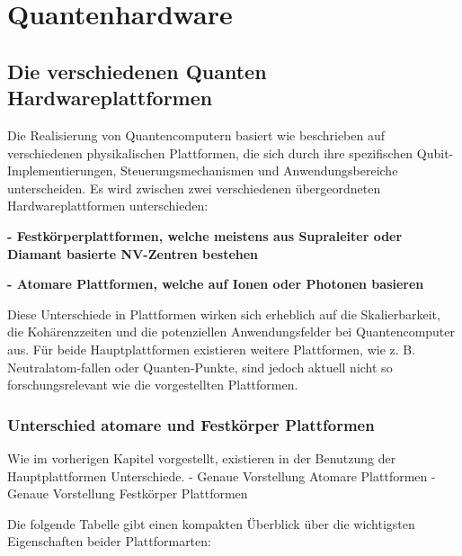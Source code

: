 \chapter{Quantenhardware}
\label{hardware} %



\section{Die verschiedenen Quanten Hardwareplattformen}
Die Realisierung von Quantencomputern basiert wie beschrieben auf verschiedenen physikalischen Plattformen, die sich durch ihre spezifischen Qubit-Implementierungen, Steuerungsmechanismen und Anwendungsbereiche unterscheiden. Es wird zwischen zwei verschiedenen übergeordneten Hardwareplattformen unterschieden:


\textbf{    - Festkörperplattformen, welche meistens aus Supraleiter oder Diamant basierte NV-Zentren bestehen } 

\textbf{    - Atomare Plattformen, welche auf Ionen oder Photonen basieren} 

Diese Unterschiede in Plattformen wirken sich erheblich auf die Skalierbarkeit, die Kohärenzzeiten und die potenziellen Anwendungsfelder bei Quantencomputer aus. Für beide Hauptplattformen existieren weitere Plattformen, wie z. B. Neutralatom-fallen oder Quanten-Punkte, sind jedoch aktuell nicht so forschungsrelevant wie die vorgestellten Plattformen.

\subsection{Unterschied atomare und Festkörper Plattformen}

Wie im vorherigen Kapitel vorgestellt, existieren in der Benutzung der Hauptplattformen Unterschiede.
- Genaue Vorstellung Atomare Plattformen
- Genaue Vorstellung Festkörper Plattformen

Die folgende Tabelle gibt einen kompakten Überblick über die wichtigsten Eigenschaften beider Plattformarten:

